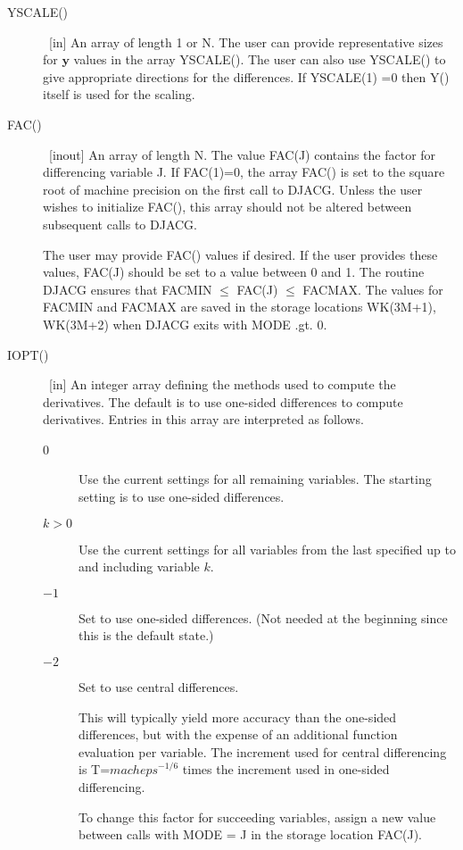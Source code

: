 \documentclass[twoside]{MATH77}
\begin{document}
\begin{description}
\item[YSCALE()]  \ [in] An array of length 1 or N. The user can provide
             representative sizes for $\mathbf{y}$ values in the array
             YSCALE(). The user can also use YSCALE() to give
             appropriate directions for the differences.  If YSCALE(1) =0
             then Y() itself is used for the scaling.

\item[FAC()]      \ [inout] An array of length N. The value
FAC(J)  contains the factor for differencing variable J.
  If FAC(1)=0, the array FAC() is set to the square root  of
  machine  precision on the first call to DJACG.
  Unless the user wishes to initialize FAC(),
  this array should not be altered between subsequent  calls
  to  DJACG.

     The user  may  provide  FAC()  values  if  desired.
   If the user provides these values, FAC(J) should be
   set to a value between 0 and 1.  The routine DJACG
   ensures that FACMIN $\leq$ FAC(J) $\leq$ FACMAX.  The values
   for FACMIN  and FACMAX are saved in the storage
   locations WK(3M+1), WK(3M+2)
   when DJACG exits with MODE .gt. 0.

\item[IOPT()] \ [in] An integer array defining the methods used to
   compute the derivatives.  The default is to use one-sided differences to
   compute derivatives.  Entries in this array are interpreted as follows.

\begin{description}
\item[0] Use the current settings for all remaining variables.  The starting
  setting is to use one-sided differences.
\item[$k > 0$] Use the current settings for all variables from the last 
specified up to and including variable $k$.
\item[$-1$] Set to use  one-sided differences.  (Not needed at the 
beginning since this is the default state.)
\item[$-2$] Set to use central differences.
  
  This will typically yield more accuracy than the one-sided differences, but
  with the expense of an additional function evaluation per variable.  The
  increment used for central differencing is T=$\mathit{macheps}^{-1/6}$
  times the increment used in one-sided differencing.
          
  To change this factor for succeeding variables, assign a new value between
  calls with MODE = J in the storage location FAC(J).
  

\end{description}
\end{description}
\end{document}
